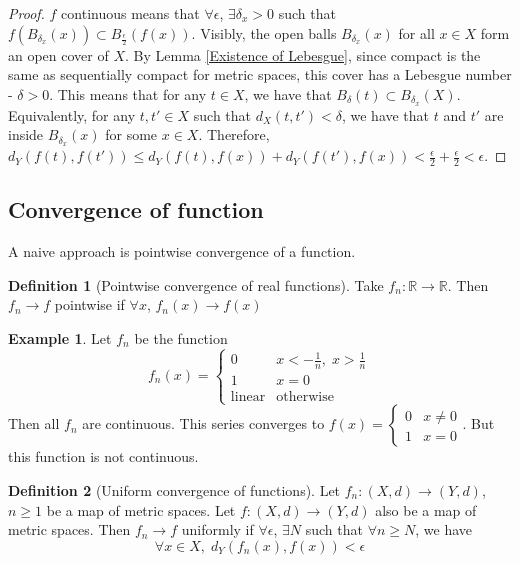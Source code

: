 \documentclass{article}
\theoremstyle{definition}
\newtheorem{defn}{Definition}[section]
\newtheorem{exmp}{Example}[section]
\theoremstyle{plain}%
\theoremstyle{remark}
\newcommand{\R}{\mathbb{R}}
\begin{document}
\begin{proof}
    $f$ continuous means that $\forall \epsilon$, $\exists \delta_x > 0$ such that $f(B_{\delta_x}(x)) \subset B_{\frac{\epsilon}{2}}(f(x))$. Visibly, the open balls $B_{\delta_x}(x)$ for all $x \in X$ form an open cover of $X$. By Lemma \ref{Existence of Lebesgue}, since compact is the same as sequentially compact for metric spaces, this cover has a Lebesgue number - $\delta > 0$. This means that for any $t \in X$, we have that $B_{\delta}(t) \subset B_{\delta_x}(X)$. Equivalently, for any $t, t' \in X$ such that $d_X(t, t') < \delta$, we have that $t$ and $t'$ are inside $B_{\delta_x}(x)$ for some $x \in X$. Therefore, $d_Y(f(t), f(t')) \le d_Y(f(t), f(x)) + d_Y(f(t'), f(x)) < \frac{\epsilon}{2} + \frac{\epsilon}{2} < \epsilon$.
\end{proof}

\subsection{Convergence of function}

A naive approach is pointwise convergence of a function.

\begin{defn}[Pointwise convergence of real functions]
    Take $f_n : \R \to \R$. Then $f_n \to f$ pointwise if $\forall x$, $f_n(x) \to f(x)$
\end{defn}

\begin{exmp}
    Let $f_n$ be the function
    \[f_n (x) = \begin{cases} 0 &x < -\frac{1}{n}, \; x > \frac{1}{n} \\ 1 &x=0 \\ \text{linear} &\text{otherwise} \end{cases}\]
    Then all $f_n$ are continuous. This series converges to $f(x) = \begin{cases} 0 &x \ne 0 \\ 1 &x=0 \end{cases}$. But this function is not continuous.
\end{exmp}

\begin{defn}[Uniform convergence of functions]
    Let $f_n : (X,d) \to (Y,d)$, $n \ge 1$ be a map of metric spaces. Let $f : (X,d) \to (Y,d)$ also be a map of metric spaces. Then $f_n \to f$ uniformly if $\forall \epsilon$, $\exists N$ such that $\forall n \ge N$, we have \[\forall x \in X, \; d_Y(f_n(x), f(x)) < \epsilon\]
\end{defn}
\end{document}
